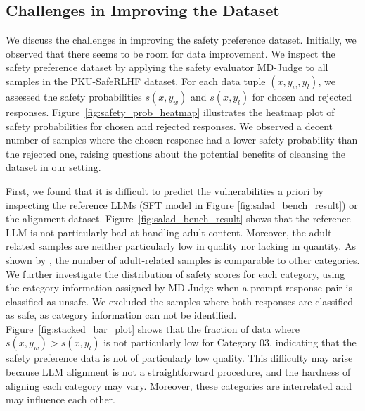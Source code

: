 \subsection{Challenges in Improving the Dataset}
\label{sec:challenges-data-improvement}


We discuss the challenges in improving the safety preference dataset. Initially, we observed that there seems to be room for data improvement. We inspect the safety preference dataset by applying the safety evaluator MD-Judge to all samples in the PKU-SafeRLHF dataset. For each data tuple $(x, y_w, y_l)$, we assessed the safety probabilities $s(x, y_w)$ and $s(x, y_l)$ for chosen and rejected responses. Figure~\ref{fig:safety_prob_heatmap} illustrates the heatmap plot of safety probabilities for chosen and rejected responses. We observed a decent number of samples where the chosen response had a lower safety probability than the rejected one, raising questions about the potential benefits of cleansing the dataset in our setting.

First, we found that it is difficult to predict the vulnerabilities a priori by inspecting the reference LLMs (SFT model in Figure \ref{fig:salad_bench_result}) or the alignment dataset. Figure~\ref{fig:salad_bench_result} shows that the reference LLM is not particularly bad at handling adult content. Moreover, the adult-related samples are neither particularly low in quality nor lacking in quantity. As shown by \citet{ji2024pku}, the number of adult-related samples is comparable to other categories. We further investigate the distribution of safety scores for each category, using the category information assigned by MD-Judge when a prompt-response pair is classified as unsafe. We excluded the samples where both responses are classified as safe, as category information can not be identified. Figure~\ref{fig:stacked_bar_plot} shows that the fraction of data where $s(x, y_w) > s(x, y_l)$ is not particularly low for Category 03, indicating that the safety preference data is not of particularly low quality. This difficulty may arise because LLM alignment is not a straightforward procedure, and the hardness of aligning each category may vary. Moreover, these categories are interrelated and may influence each other.

